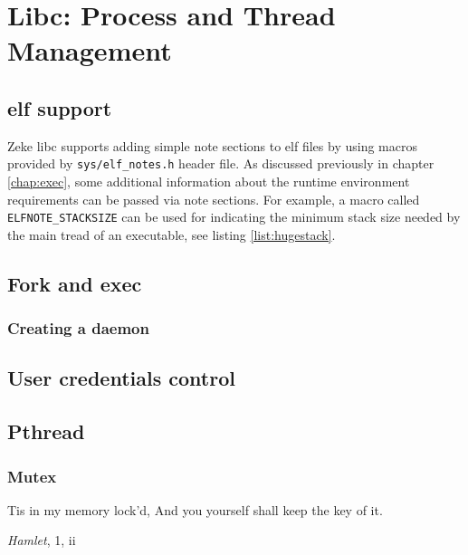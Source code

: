 \chapter{Libc: Process and Thread Management}

\section{\acs{elf} support}\label{sec:libc_elf}

Zeke libc supports adding simple note sections to \acs{elf} files by using
macros provided by \verb+sys/elf_notes.h+ header file. As discussed
previously in chapter \ref{chap:exec}, some additional information about the
runtime environment requirements can be passed via note sections. For example,
a macro called \verb+ELFNOTE_STACKSIZE+ can be used for indicating the minimum
stack size needed by the main tread of an executable, see listing
\ref{list:hugestack}.



\section{Fork and exec}

\subsection{Creating a daemon}



\section{User credentials control}

\section{Pthread}
\subsection{Mutex}

\epigraph{Tis in my memory lock'd,\newline
          And you yourself shall keep the key of it.}{\textit{Hamlet}, 1, ii}


